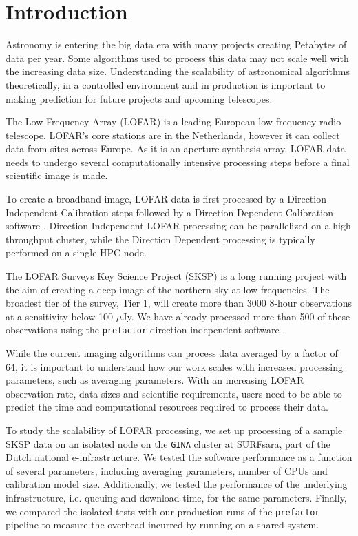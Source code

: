 \documentclass[preprint,5p]{elsarticle}
\begin{document}
\section{\label{sec:intro}Introduction }

Astronomy is entering the big data era with many projects creating Petabytes of data per year. Some algorithms used to process this data may not scale well with the increasing data size. Understanding the scalability of astronomical algorithms theoretically, in a controlled environment and in production is important to making prediction for future projects and upcoming telescopes. 

The Low Frequency Array (LOFAR) \citep{LOFAR} is a leading European low-frequency radio telescope. LOFAR's core stations are in the Netherlands, however it can collect data from sites across Europe. As it is an aperture synthesis array, LOFAR data needs to undergo several computationally intensive processing steps before a final scientific image is made. 

To create a broadband image, LOFAR data is first processed by a Direction Independent Calibration steps followed by a Direction Dependent Calibration software \citep{lofar_prefactor, Wendy_bootes,tassesmirnov, tasse2018faceting}. Direction Independent LOFAR processing can be parallelized on a high throughput cluster, while the Direction Dependent processing is typically performed on a single HPC node. 

The LOFAR Surveys Key Science Project (SKSP) \citep{lotss} is a long running project with the aim of creating a deep image of the northern sky at low frequencies. The broadest tier of the survey, Tier 1, will create more than 3000 8-hour observations at a sensitivity below 100 $\mu$Jy. We have already processed more than 500 of these observations using the \texttt{prefactor} direction independent software \citep{prefactor_zenodo}. 

While the current imaging algorithms can process data averaged by a factor of 64, it is important to understand how our work scales with increased processing parameters, such as averaging parameters. With an increasing LOFAR observation rate, data sizes and scientific requirements, users need to be able to predict the time and computational resources required to process their data.  

To study the scalability of LOFAR processing, we set up processing of a sample SKSP data on an isolated node on the \texttt{GINA} cluster at SURFsara, part of the Dutch national e-infrastructure. We tested the software performance as a function of several parameters, including averaging parameters, number of CPUs and calibration model size. Additionally, we tested the performance of the underlying infrastructure, i.e. queuing  and download time, for the same parameters. Finally, we compared the isolated tests with our production runs of the \texttt{prefactor} pipeline to measure the overhead incurred by running on a shared system. 
\end{document}
